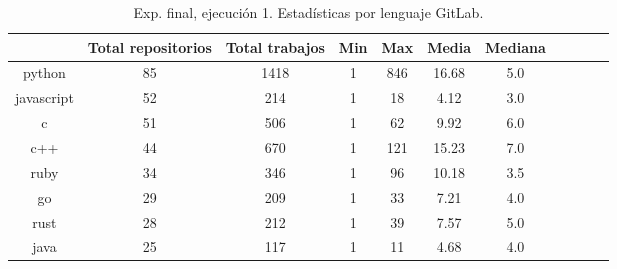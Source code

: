 \begin{table}[h]
  \centering
  \caption{Exp. final, ejecución 1. Estadísticas por lenguaje GitLab.}
  \label{tab:tabla_f1_8}

\begin{footnotesize}
\renewcommand{\arraystretch}{1.5} %
\begin{tabular}{ccccccccccc}
  \hline
  {} &  Total repositorios &  Total trabajos &  Min &  Max &  Media &  Mediana \\
  \hline
  python           &         85 &        1418 &    1 &  846 &  16.68 &      5.0 \\
  javascript       &         52 &         214 &    1 &   18 &   4.12 &      3.0 \\
  c                &         51 &         506 &    1 &   62 &   9.92 &      6.0 \\
  c++              &         44 &         670 &    1 &  121 &  15.23 &      7.0 \\
  ruby             &         34 &         346 &    1 &   96 &  10.18 &      3.5 \\
  go               &         29 &         209 &    1 &   33 &   7.21 &      4.0 \\
  rust             &         28 &         212 &    1 &   39 &   7.57 &      5.0 \\
  java             &         25 &         117 &    1 &   11 &   4.68 &      4.0 \\

\end{tabular}
\end{footnotesize}
\end{table}
